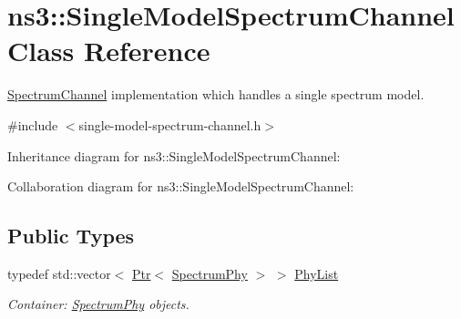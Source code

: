 \hypertarget{classns3_1_1SingleModelSpectrumChannel}{}\section{ns3\+:\+:Single\+Model\+Spectrum\+Channel Class Reference}
\label{classns3_1_1SingleModelSpectrumChannel}


\hyperlink{classns3_1_1SpectrumChannel}{Spectrum\+Channel} implementation which handles a single spectrum model.  




{\ttfamily \#include $<$single-\/model-\/spectrum-\/channel.\+h$>$}



Inheritance diagram for ns3\+:\+:Single\+Model\+Spectrum\+Channel\+:


Collaboration diagram for ns3\+:\+:Single\+Model\+Spectrum\+Channel\+:
\subsection*{Public Types}
\begin{DoxyCompactItemize}
\item 
typedef std\+::vector$<$ \hyperlink{classns3_1_1Ptr}{Ptr}$<$ \hyperlink{classns3_1_1SpectrumPhy}{Spectrum\+Phy} $>$ $>$ \hyperlink{classns3_1_1SingleModelSpectrumChannel_ae4074733fa381728394ce6e8a54dc664}{Phy\+List}
\begin{DoxyCompactList}\small\item\em Container\+: \hyperlink{classns3_1_1SpectrumPhy}{Spectrum\+Phy} objects. \end{DoxyCompactList}\end{DoxyCompactItemize}
